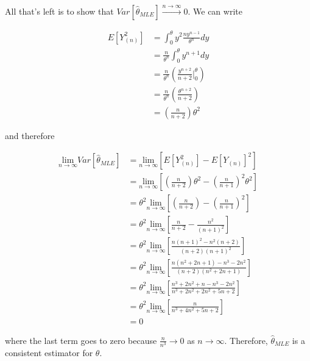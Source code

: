 \documentclass[
  letterpaper,
  DIV=11,
  numbers=noendperiod]{scrreprt}
\begin{document}
All that's left is to show that
\(Var\left[\hat{\theta}_{MLE}\right] \overset{n \to \infty}{\to} 0\). We
can write

\begin{align*}
        E\left[Y_{(n)}^2\right] & = \int_0^\theta y^2 \frac{ny^{n-1}}{\theta^n} dy \\
        & = \frac{n}{\theta^n} \int_0^\theta y^{n + 1} dy \\
        & = \frac{n}{\theta^n} \left( \frac{y^{n + 2}}{n + 2} \bigg|_0^\theta \right) \\
        & = \frac{n}{\theta^n} \left( \frac{\theta^{n + 2}}{n + 2}\right) \\
        & = \left( \frac{n}{n + 2} \right) \theta^2
    \end{align*}

and therefore

\begin{align*}
    \underset{n \to \infty}{\text{lim}} Var\left[\hat{\theta}_{MLE}\right] & = \underset{n \to \infty}{\text{lim}} \left[ E\left[Y_{(n)}^2\right] - E\left[Y_{(n)}\right]^2 \right]\\
    & = \underset{n \to \infty}{\text{lim}} \left[ \left( \frac{n}{n + 2} \right) \theta^2 - \left( \frac{n}{n + 1} \right)^2 \theta^2 \right] \\
    & = \theta^2 \underset{n \to \infty}{\text{lim}} \left[ \left( \frac{n}{n + 2} \right)  - \left( \frac{n}{n + 1} \right)^2\right] \\
    & = \theta^2 \underset{n \to \infty}{\text{lim}} \left[  \frac{n}{n + 2}   - \frac{n^2}{(n + 1)^2} \right] \\
    & = \theta^2 \underset{n \to \infty}{\text{lim}} \left[  \frac{n(n + 1)^2 - n^2 (n + 2)}{(n + 2)(n + 1)^2} \right] \\
    & = \theta^2 \underset{n \to \infty}{\text{lim}} \left[  \frac{n(n^2 + 2n + 1) - n^3 -2n^2}{(n + 2)(n^2 + 2n + 1)} \right] \\
    & = \theta^2 \underset{n \to \infty}{\text{lim}} \left[  \frac{n^3 + 2n^2 + n - n^3 -2n^2}{n^3 + 2n^2 + 2n^2 + 5n + 2} \right] \\
    & = \theta^2 \underset{n \to \infty}{\text{lim}} \left[  \frac{n}{n^3 + 4n^2  + 5n + 2} \right] \\
    & = 0
\end{align*}

where the last term goes to zero because \(\frac{n}{n^3} \to 0\) as
\(n \to \infty\). Therefore, \(\hat{\theta}_{MLE}\) is a consistent
estimator for \(\theta\).
\end{document}
